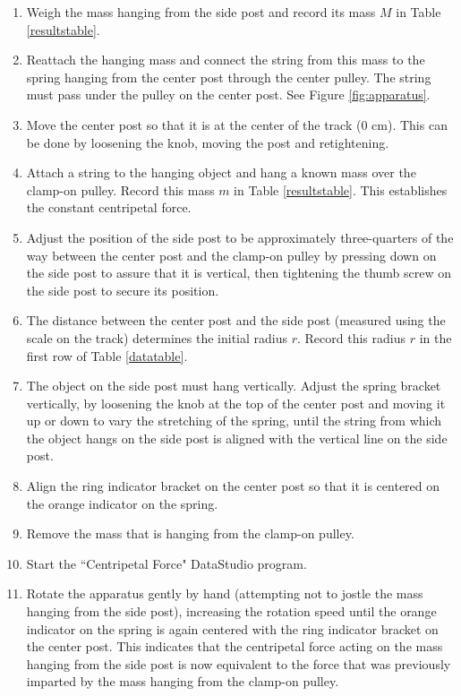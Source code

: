 \begin{enumerate}
	\item Weigh the mass hanging from the side post and record its mass $M$ in Table \ref{resultstable}.
	\item Reattach the hanging mass and connect the string from this mass to the spring hanging from the center post through the center pulley. The string must pass under the pulley on the center post. See Figure \ref{fig:apparatus}.
	\item Move the center post so that it is at the center of the track (0 cm). This can be done by loosening the knob, moving the post and retightening.
	\item Attach a string to the hanging object and hang a known mass over the clamp-on pulley. Record this mass $m$ in Table \ref{resultstable}. This establishes the constant centripetal force.
	\item Adjust the position of the side post to be approximately three-quarters of the way between the center post and the clamp-on pulley by pressing down on the side post to assure that it is vertical, then tightening the thumb screw on the side post to secure its position.
	\item The distance between the center post and the side post (measured using the scale on the track) determines the initial radius $r$. Record this radius $r$ in the first row of Table \ref{datatable}.
	\item The object on the side post must hang vertically. Adjust the spring bracket vertically, by loosening the knob at the top of the center post and moving it up or down to vary the stretching of the spring, until the string from which the object hangs on the side post is aligned with the vertical line on the side post.
	\item Align the ring indicator bracket on the center post so that it is centered on the orange indicator on the spring.
	\item Remove the mass that is hanging from the clamp-on pulley.
	\item Start the ``Centripetal Force" DataStudio program.
	\item Rotate the apparatus gently by hand (attempting not to jostle the mass hanging from the side post), increasing the rotation speed until the orange indicator on the spring is again centered with the ring indicator bracket on the center post. This indicates that the centripetal force acting on the mass hanging from the side post is now equivalent to the force that was previously imparted by the mass hanging from the clamp-on pulley.

\end{enumerate}
